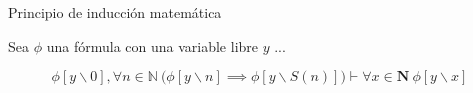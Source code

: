 \begin{axiom} \label{nat_ind}
	Principio de inducción matemática
	\begin{center}
		Sea $\phi$ una fórmula con una variable libre $y$ ...
	\end{center}
	\begin{equation}
		\phi \left[y\backslash0\right], 
		 \forall n \in \mathbb{N}\ {\big (} \phi\left[y\backslash n\right] \implies \phi\left[y \backslash S(n)\right] {\big )} \vdash \forall x \in \mathbf{N}\ \phi \left[y \backslash x\right]
	\end{equation}
\end{axiom}
